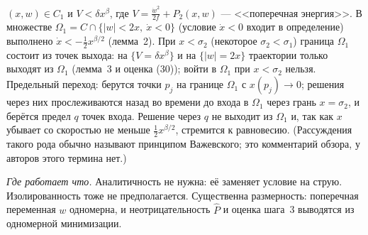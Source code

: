 \documentclass[11pt,a4paper]{article}
\theoremstyle{definition}
\begin{document}
\begin{enumerate}[leftmargin=*]
$(x,w)\in C_1$ и $V<\delta x^\beta$, где $V=\frac{\dot w^2}{2f}+P_2(x,w)$ --- <<поперечная энергия>>. В множестве
$\Omega_1=C\cap\{|w|<2x,\ \dot x<0\}$ (условие $\dot x<0$ входит в определение) выполнено
$\dot x<-\frac12x^{\beta/2}$ (лемма~2). При $x<\sigma_2$ (некоторое $\sigma_2<\sigma_1$) граница $\Omega_1$
состоит из точек выхода: на $\{V=\delta x^\beta\}$ и на $\{|w|=2x\}$ траектории только выходят из
$\Omega_1$ (лемма~3 и оценка (30)); войти в $\Omega_1$ при $x<\sigma_2$ нельзя. Предельный переход: берутся точки $p_j$ на границе $\Omega_1$ с $x(p_j)\to0$; решения через
них прослеживаются назад во времени до входа в $\Omega_1$ через грань $x=\sigma_2$, и берётся предел $q$
точек входа. Решение через $q$ не выходит из $\Omega_1$ и, так как $x$ убывает со скоростью не меньше
$\frac12x^{\beta/2}$, стремится к равновесию. (Рассуждения такого рода обычно называют принципом
Важевского; это комментарий обзора, у авторов этого термина нет.)
\end{enumerate}

\emph{Где работает что.} Аналитичность не нужна: её заменяет условие на струю. Изолированность
тоже не предполагается. Существенна размерность: поперечная переменная $w$ одномерна, и
неотрицательность $\hat P$ и оценка шага~3 выводятся из одномерной минимизации.
\end{document}
